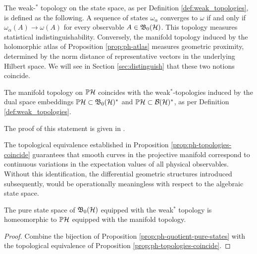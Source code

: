 \begin{remark}
	The weak-$^*$ topology on the state space, as per Definition \ref{def:weak_topologies}, is defined as the following. A sequence of states $\omega_\alpha$ converges to $\omega$ if and only if $\omega_\alpha(A) \to \omega(A)$ for every observable $A \in \mathfrak{B}_0(\H)$. This topology measures statistical indistinguishability. Conversely, the manifold topology induced by the holomorphic atlas of Proposition \ref{prop:ph-atlas} measures geometric proximity, determined by the norm distance of representative vectors in the underlying Hilbert space. We will see in Section \ref{sec:distinguish} that these two notions coincide.
\end{remark}

\begin{proposition}
	\label{prop:ph-topologies-coincide}
	The manifold topology on $\PH$ coincides with the weak$^*$-topologies induced by the dual space embeddings $\PH\subset\mathfrak{B}_0(\H)^*$ and $\PH\subset\BH^*$, as per Definition \ref{def:weak_topologies}. 
\end{proposition}

\noindent The proof of this statement is given in \cite[Proposition 2.5.2]{landsmanMathematicalTopicsClassical1998}.

\begin{remark}
	The topological equivalence established in Proposition \ref{prop:ph-topologies-coincide} guarantees that smooth curves in the projective manifold correspond to continuous variations in the expectation values of all physical observables. Without this identification, the differential geometric structures introduced subsequently, would be operationally meaningless with respect to the algebraic state space.
\end{remark}

\begin{corollary}
	\label{cor:pure-state-b0h-ph}
	The pure state space of $\mathfrak{B}_0(\H)$ equipped with the weak$^*$ topology is homeomorphic to $\PH$ equipped with the manifold topology. 
\end{corollary}

\begin{proof}
	Combine the bijection of Proposition \ref{prop:ph-quotient-pure-states} with the topological equivalence of Proposition \ref{prop:ph-topologies-coincide}. 
\end{proof}

